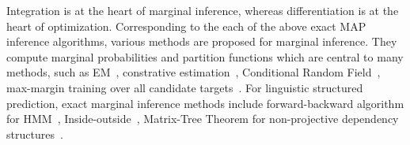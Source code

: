 Integration is at the heart of marginal
inference, whereas differentiation is at the heart of
optimization. Corresponding to the each of the above exact MAP
inference algorithms, various methods are proposed for marginal
inference. They compute marginal probabilities and partition functions
which are central to many methods, such as
EM~\citep{baker1979trainable,weizenbaum1966eliza}, constrative
estimation~\citep{smith2005contrastive}, Conditional Random
Field~\citep[CRF,][]{lafferty01crf}, max-margin training over all
candidate targets~\cite{koller2004max}. For linguistic structured
prediction, exact marginal inference methods include forward-backward
algorithm for HMM~\citep{binder1997space},
Inside-outside~\citep{baker1979trainable}, Matrix-Tree Theorem for
non-projective dependency
structures~\citep{koo-etal-2007-structured,liu2018learning}.

